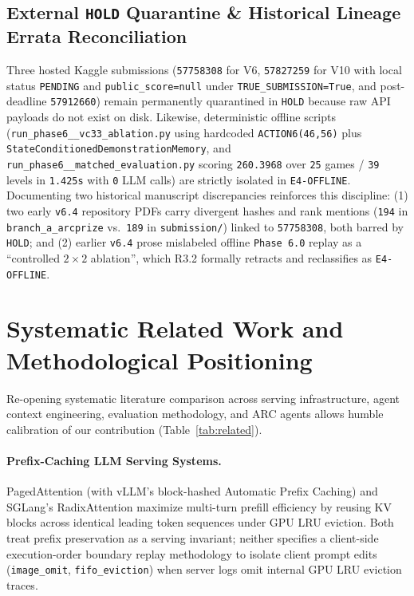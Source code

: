 \documentclass[10pt]{article}
\newcommand{\code}[1]{\texttt{#1}}
\begin{document}
\subsection{External \code{HOLD} Quarantine \& Historical Lineage Errata Reconciliation}
Three hosted Kaggle submissions (\code{57758308} for V6, \code{57827259} for V10 with local status \code{PENDING} and \code{public\_\allowbreak score=null} under \code{TRUE\_\allowbreak SUBMISSION=True}, and post-deadline \code{57912660}) remain permanently quarantined in \code{HOLD} because raw API payloads do not exist on disk. Likewise, deterministic offline scripts (\code{run\_\allowbreak phase6\_\_\allowbreak vc33\_\allowbreak ablation.py} using hardcoded \code{ACTION6(46,56)} plus \code{StateConditioned\allowbreak Demonstration\allowbreak Memory}, and \code{run\_\allowbreak phase6\_\_\allowbreak matched\_\allowbreak evaluation.py} scoring \code{260.3968} over \code{25} games / \code{39} levels in \code{1.425s} with \code{0} LLM calls) are strictly isolated in \code{E4-OFFLINE}. Documenting two historical manuscript discrepancies reinforces this discipline: (1) two early \code{v6.4} repository PDFs carry divergent hashes and rank mentions (\code{194} in \code{branch\_a\_\allowbreak arcprize} vs.\ \code{189} in \code{submission/}) linked to \code{57758308}, both barred by \code{HOLD}; and (2) earlier \code{v6.4} prose mislabeled offline \code{Phase 6.0} replay as a ``controlled $2 \times 2$ ablation'', which R3.2 formally retracts and reclassifies as \code{E4-OFFLINE}.

\section{Systematic Related Work and Methodological Positioning}
\label{sec:related}

Re-opening systematic literature comparison across serving infrastructure, agent context engineering, evaluation methodology, and ARC agents allows humble calibration of our contribution (Table~\ref{tab:related}).

\paragraph{Prefix-Caching LLM Serving Systems.}
PagedAttention \citep{kwon2023pagedattention} (with vLLM's block-hashed Automatic Prefix Caching) and SGLang's RadixAttention \citep{zheng2024sglang} maximize multi-turn prefill efficiency by reusing KV blocks across identical leading token sequences under GPU LRU eviction. Both treat prefix preservation as a serving invariant; neither specifies a client-side execution-order boundary replay methodology to isolate client prompt edits (\code{image\_omit}, \code{fifo\_eviction}) when server logs omit internal GPU LRU eviction traces.
\end{document}
